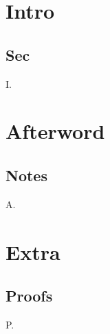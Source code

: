 \documentclass{book}
\begin{document}
\mainmatter
\chapter{Intro}
\section{Sec}
I.
\backmatter
\chapter{Afterword}
\section{Notes}
A.
\appendix
\chapter{Extra}
\section{Proofs}
P.
\end{document}
